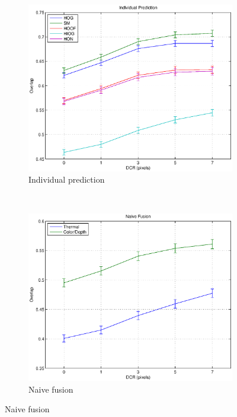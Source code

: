 \documentclass[10pt,twocolumn,letterpaper]{article}
\begin{document}
 \begin{figure}[ht]
	 \centering
	 \begin{subfigure}[b]{0.47\textwidth}
 		\includegraphics[width=1\textwidth]{results/individualprediction.eps}
 		\caption{Individual prediction}
    		\label{fig:individualprediction}
 	\end{subfigure}
	 ~
	\begin{subfigure}[b]{0.47\textwidth}
 		\includegraphics[width=1\textwidth]{results/naivefusion.eps}
 		\caption{Naive fusion}
    		\label{fig:naivefusion}
 	\end{subfigure}

\end{figure}
\end{document}
